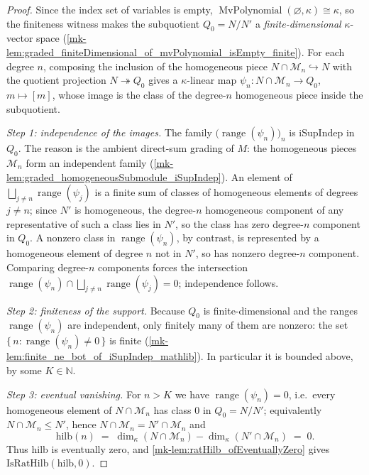 \begin{proof}
  \leanok
    Since the index set of variables is empty,
  \(\operatorname{MvPolynomial}(\varnothing, \kappa) \cong \kappa\), so the finiteness
  witness makes the subquotient \(Q_0 = N/N'\) a \emph{finite-dimensional}
  \(\kappa\)-vector space
  (\ref{mk-lem:graded_finiteDimensional_of_mvPolynomial_isEmpty_finite}). For each
  degree \(n\), composing the inclusion of the homogeneous piece
  \(N \cap \mathcal{M}_n \hookrightarrow N\) with the quotient projection
  \(N \twoheadrightarrow Q_0\) gives a \(\kappa\)-linear map
  \(\psi_n : N \cap \mathcal{M}_n \to Q_0\), \(m \mapsto [m]\), whose image is the
  class of the degree-\(n\) homogeneous piece inside the subquotient.

  \emph{Step 1: independence of the images.} The family
  \(\bigl(\operatorname{range}(\psi_n)\bigr)_{n}\) is \(\mathrm{iSupIndep}\) in
  \(Q_0\). The reason is the ambient direct-sum grading of \(M\): the homogeneous
  pieces \(\mathcal{M}_n\) form an independent family
  (\ref{mk-lem:graded_homogeneousSubmodule_iSupIndep}). An element of
  \(\bigsqcup_{j \ne n} \operatorname{range}(\psi_j)\) is a finite sum of classes of
  homogeneous elements of degrees \(j \ne n\); since \(N'\) is homogeneous, the
  degree-\(n\) homogeneous component of any representative of such a class lies in
  \(N'\), so the class has zero degree-\(n\) component in \(Q_0\). A nonzero class in
  \(\operatorname{range}(\psi_n)\), by contrast, is represented by a homogeneous
  element of degree \(n\) not in \(N'\), so has nonzero degree-\(n\) component.
  Comparing degree-\(n\) components forces the intersection
  \(\operatorname{range}(\psi_n) \cap \bigsqcup_{j \ne n} \operatorname{range}(\psi_j)
  = 0\); independence follows.

  \emph{Step 2: finiteness of the support.} Because \(Q_0\) is finite-dimensional and
  the ranges \(\operatorname{range}(\psi_n)\) are independent, only finitely many of
  them are nonzero: the set \(\{\,n : \operatorname{range}(\psi_n) \ne 0\,\}\) is
  finite (\ref{mk-lem:finite_ne_bot_of_iSupIndep_mathlib}). In particular it is bounded
  above, by some \(K \in \mathbb{N}\).

  \emph{Step 3: eventual vanishing.} For \(n > K\) we have
  \(\operatorname{range}(\psi_n) = 0\), i.e.\ every homogeneous element of
  \(N \cap \mathcal{M}_n\) has class \(0\) in \(Q_0 = N/N'\); equivalently
  \(N \cap \mathcal{M}_n \le N'\), hence \(N \cap \mathcal{M}_n = N' \cap \mathcal{M}_n\)
  and
  \[
    \mathrm{hilb}(n) \;=\; \dim_\kappa(N \cap \mathcal{M}_n)
      - \dim_\kappa(N' \cap \mathcal{M}_n) \;=\; 0 .
  \]
  Thus \(\mathrm{hilb}\) is eventually zero, and
  \ref{mk-lem:ratHilb_ofEventuallyZero} gives \(\mathrm{IsRatHilb}(\mathrm{hilb}, 0)\).
\end{proof}

